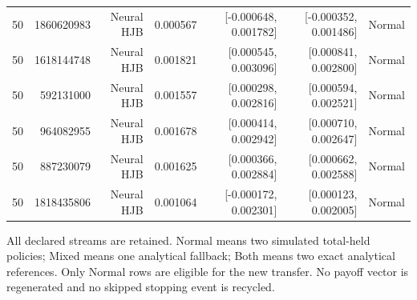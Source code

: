\begin{longtable}{lrrrrrr}
50 & 1860620983 & Neural HJB & 0.000567 & [-0.000648, 0.001782] & [-0.000352, 0.001486] & Normal \\
50 & 1618144748 & Neural HJB & 0.001821 & [0.000545, 0.003096] & [0.000841, 0.002800] & Normal \\
50 & 592131000 & Neural HJB & 0.001557 & [0.000298, 0.002816] & [0.000594, 0.002521] & Normal \\
50 & 964082955 & Neural HJB & 0.001678 & [0.000414, 0.002942] & [0.000710, 0.002647] & Normal \\
50 & 887230079 & Neural HJB & 0.001625 & [0.000366, 0.002884] & [0.000662, 0.002588] & Normal \\
50 & 1818435806 & Neural HJB & 0.001064 & [-0.000172, 0.002301] & [0.000123, 0.002005] & Normal \\
\bottomrule
\end{longtable}
\par\medskip\noindent\footnotesize All declared streams are retained. Normal means two simulated total-held policies; Mixed means one analytical fallback; Both means two exact analytical references. Only Normal rows are eligible for the new transfer. No payoff vector is regenerated and no skipped stopping event is recycled.
\endgroup
